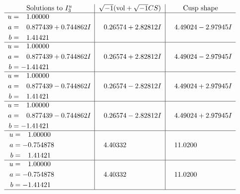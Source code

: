 \documentclass[1p]{elsarticle_modified}
\theoremstyle{definition}
\newcommand{\I}{\sqrt{-1}}
\begin{document}
$$\begin{array}{c|c|c}  
\text{Solutions to }I^u_{3}& \I (\text{vol} + \sqrt{-1}CS) & \text{Cusp shape}\\
 \hline 
\begin{aligned}
u &= \phantom{-}1.00000\phantom{ +0.000000I} \\
a &= \phantom{-}0.877439 + 0.744862 I \\
b &= \phantom{-}1.41421\phantom{ +0.000000I}\end{aligned}
 & \phantom{-}0.26574 + 2.82812 I & \phantom{-}4.49024 - 2.97945 I \\ \hline\begin{aligned}
u &= \phantom{-}1.00000\phantom{ +0.000000I} \\
a &= \phantom{-}0.877439 + 0.744862 I \\
b &= -1.41421\phantom{ +0.000000I}\end{aligned}
 & \phantom{-}0.26574 + 2.82812 I & \phantom{-}4.49024 - 2.97945 I \\ \hline\begin{aligned}
u &= \phantom{-}1.00000\phantom{ +0.000000I} \\
a &= \phantom{-}0.877439 - 0.744862 I \\
b &= \phantom{-}1.41421\phantom{ +0.000000I}\end{aligned}
 & \phantom{-}0.26574 - 2.82812 I & \phantom{-}4.49024 + 2.97945 I \\ \hline\begin{aligned}
u &= \phantom{-}1.00000\phantom{ +0.000000I} \\
a &= \phantom{-}0.877439 - 0.744862 I \\
b &= -1.41421\phantom{ +0.000000I}\end{aligned}
 & \phantom{-}0.26574 - 2.82812 I & \phantom{-}4.49024 + 2.97945 I \\ \hline\begin{aligned}
u &= \phantom{-}1.00000\phantom{ +0.000000I} \\
a &= -0.754878\phantom{ +0.000000I} \\
b &= \phantom{-}1.41421\phantom{ +0.000000I}\end{aligned}
 & \phantom{-}4.40332\phantom{ +0.000000I} & \phantom{-}11.0200\phantom{ +0.000000I} \\ \hline\begin{aligned}
u &= \phantom{-}1.00000\phantom{ +0.000000I} \\
a &= -0.754878\phantom{ +0.000000I} \\
b &= -1.41421\phantom{ +0.000000I}\end{aligned}
 & \phantom{-}4.40332\phantom{ +0.000000I} & \phantom{-}11.0200\phantom{ +0.000000I}\\
 \hline 
 \end{array}$$\newpage
\end{document}
